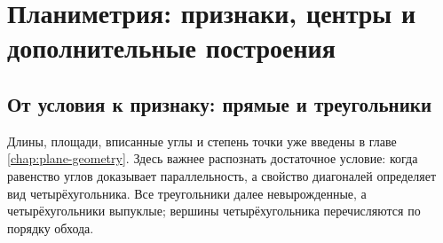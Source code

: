 \chapter{Планиметрия: признаки, центры и дополнительные построения}\label{chap:exam-plane}

\section{От условия к признаку: прямые и треугольники}
Длины, площади, вписанные углы и степень точки уже введены в главе \ref{chap:plane-geometry}. Здесь важнее распознать достаточное условие: когда равенство углов доказывает параллельность, а свойство диагоналей определяет вид четырёхугольника. Все треугольники далее невырожденные, а четырёхугольники выпуклые; вершины четырёхугольника перечисляются по порядку обхода.

